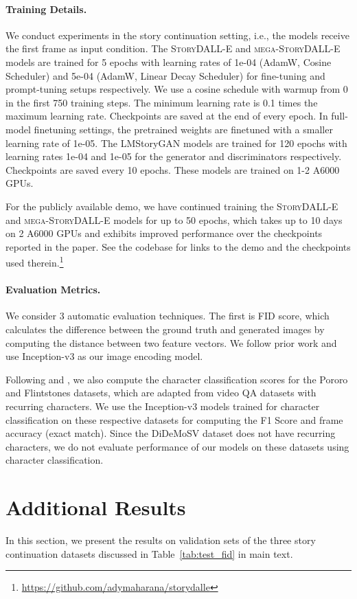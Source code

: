 \documentclass[runningheads]{llncs}
\newcommand{\sdalle}[1]{\textsc{StoryDALL-E}}
\newcommand{\sdallem}[1]{\textsc{mega-StoryDALL-E}}
\begin{document}
\paragraph{Training Details.}
We conduct experiments in the story continuation setting, i.e., the models receive the first frame as input condition. The \sdalle{} and \sdallem{} models are trained for 5 epochs with learning rates of 1e-04 (AdamW, Cosine Scheduler) and 5e-04 (AdamW, Linear Decay Scheduler) for fine-tuning and prompt-tuning setups respectively. We use a cosine schedule with warmup from 0 in the first 750 training steps. The minimum learning rate is 0.1 times the maximum learning rate. Checkpoints are saved at the end of every epoch. In full-model finetuning settings, the pretrained weights are finetuned with a smaller learning rate of 1e-05. The LMStoryGAN models are trained for 120 epochs with learning rates 1e-04 and 1e-05 for the generator and discriminators respectively. Checkpoints are saved every 10 epochs. These models are trained on 1-2 A6000 GPUs.

For the publicly available demo, we have continued training the \sdalle{} and \sdallem{} models for up to 50 epochs, which takes up to 10 days on 2 A6000 GPUs and exhibits improved performance over the checkpoints reported in the paper. See the codebase for links to the demo and the checkpoints used therein.\footnote{\url{https://github.com/adymaharana/storydalle}}


\paragraph{Evaluation Metrics.}
We consider 3 automatic evaluation techniques. The first is FID score, which calculates the difference between the ground truth and generated images by computing the distance between two feature vectors. We follow prior work and use Inception-v3 as our image encoding model. 

Following \cite{li2019storygan} and \cite{maharana2021improving}, we also compute the character classification scores for the Pororo and Flintstones datasets, which are adapted from video QA datasets with recurring characters. We use the Inception-v3 models trained for character classification on these respective datasets for computing the F1 Score and frame accuracy (exact match). Since the DiDeMoSV dataset does not have recurring characters, we do not evaluate performance of our models on these datasets using character classification.

\section{Additional Results}
In this section, we present the results on validation sets of the three story continuation datasets discussed in Table~\ref{tab:test_fid} in main text.
\end{document}

